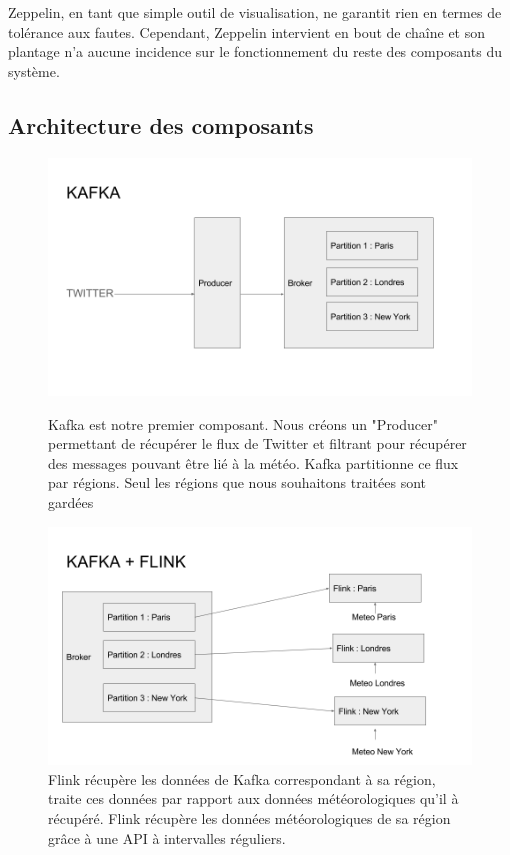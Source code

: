\documentclass[a4paper,oneside,10pt]{article}
\begin{document}
Zeppelin, en tant que simple outil de visualisation, ne garantit rien en termes de tolérance aux fautes. Cependant, Zeppelin intervient en bout de chaîne et son plantage n'a aucune incidence sur le fonctionnement du reste des composants du système. 

\subsection{Architecture des composants}

\begin{figure}[h]
\centering
\includegraphics[width=15cm]{content/Kafka.png}
\caption{Kafka est notre premier composant. Nous créons un "Producer" permettant de récupérer le flux de Twitter et filtrant pour récupérer des messages pouvant être lié à la météo. Kafka partitionne ce flux par régions. Seul les régions que nous souhaitons traitées sont gardées}
\label{fig1}
\centering
\includegraphics[width=15cm]{content/KafkaFlink.png}
\caption{Flink récupère les données de Kafka correspondant à sa région, traite ces données par rapport aux données météorologiques qu'il à récupéré. Flink récupère les données météorologiques de sa région grâce à une API à intervalles réguliers. }
\label{fig1}
\end{figure}
\end{document}
